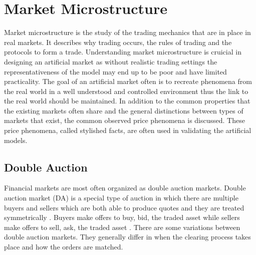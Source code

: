 \section{Market Microstructure}

Market microstructure is the study of the trading mechanics that are in place 
in real markets. It describes why trading occurs, the rules of trading 
and the protocols to form a trade. \citep[p. 3-4]{Has07}
Understanding market microstructure is cruicial in designing an artificial market
as without realistic trading settings the representativeness of the model may end
up to be poor and have limited practicality. The goal of an artificial market often
is to recreate phenomena from the real world in a well understood and controlled 
environment thus the link to the real world should be maintained. In addition to the
common properties that the existing markets often share and the general distinctions between
types of markets that exist,
 the common observed price phenomena is discussed. These price phenomena, called
stylished facts, are often used in validating the artificial models.


\subsection{Double Auction}

Financial markets are most often organized as double auction markets.
Double auction market (DA) is a special type of auction in which there
are multiple buyers and sellers which are both able to 
produce quotes and they are treated symmetrically \citep*{Kle99}. Buyers
make offers to buy, bid, the traded asset while sellers make offers
to sell, ask, the traded asset \citep*{Moc15}. There are some variations 
between double auction markets. They generally differ in when the clearing process takes place 
and how the orders are matched. 



